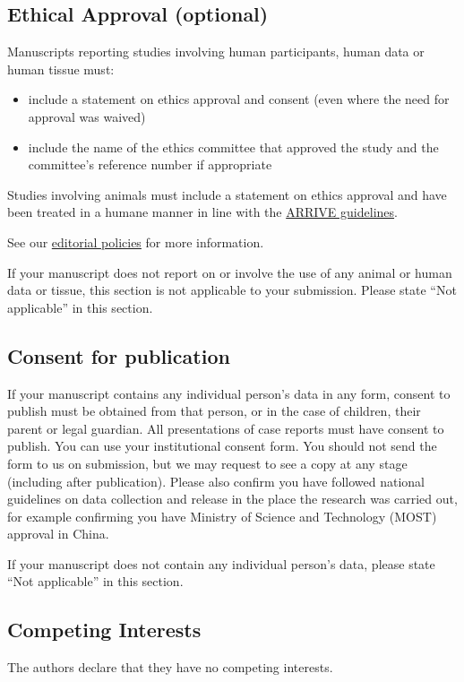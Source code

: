 \documentclass[a4paper,num-refs]{oup-contemporary}
\begin{document}
\subsection{Ethical Approval (optional)}
Manuscripts reporting studies involving human participants, human data or human tissue must:

\begin{itemize}
\item include a statement on ethics approval and consent (even where the need for approval was waived)
\item include the name of the ethics committee that approved the study and the committee's reference number if appropriate
\end{itemize}

Studies involving animals must include a statement on ethics approval and have been treated in a humane manner in line with the \href{http://www.nc3rs.org.uk/arrive-guidelines}{ARRIVE guidelines}.

See our \href{https://academic.oup.com/gigascience/pages/editorial_policies_and_reporting_standards}{editorial policies} for more information.

If your manuscript does not report on or involve the use of any animal or human data or tissue, this section is not applicable to your submission. Please state ``Not applicable'' in this section.

\subsection{Consent for publication}

If your manuscript contains any individual person's data in any form, consent to publish must be obtained from that person, or in the case of children, their parent or legal guardian. All presentations of case reports must have consent to publish. You can use your institutional consent form. You should not send the form to us on submission, but we may request to see a copy at any stage (including after publication). Please also confirm you have followed national guidelines on data collection and release in the place the research was carried out, for example confirming you have Ministry of Science and Technology (MOST) approval in China.

If your manuscript does not contain any individual person's data, please state ``Not applicable'' in this section.

\subsection{Competing Interests}
The authors declare that they have no competing interests.
\end{document}
